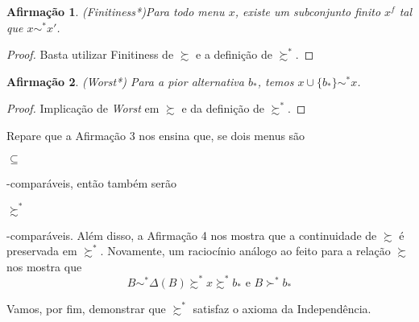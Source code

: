 \documentclass[11pt, a4paper]{article}
\theoremstyle{nonumberplain}
\newtheorem{proof}{Dem.}
\theoremstyle{plain}
\newtheorem{claim}{Afirmação}
\theoremstyle{plain}
\begin{document}
\begin{claim}(Finitiness*)Para todo menu $x$, existe um subconjunto finito $x^f$ tal que $x\sim^* x'$.\end{claim}
\begin{proof}
Basta utilizar Finitiness de $\succsim$ e a definição de $\succsim^*$. 
\end{proof}

\begin{claim} (Worst*) Para a pior alternativa $b_*$, temos $x\cup\{b_*\}\sim^* x$.\end{claim}
\begin{proof}
Implicação de \textit{Worst} em $\succsim$ e da definição de $\succsim^*$. 
\end{proof}



Repare que a Afirmação 3 nos ensina que, se dois menus são \begin{small}$\subseteq$\end{small}-comparáveis, então também serão \begin{small}$\succsim^*$\end{small}-comparáveis. Além disso, a Afirmação 4 nos mostra que a continuidade de $\succsim$ é preservada em $\succsim^*$. Novamente, um raciocínio análogo ao feito para a relação $\succsim$ nos mostra que $$B\sim^*\Delta(B)\succsim^* x\succsim^* b_* \text{ e } B\succ^* b_*$$

Vamos, por fim, demonstrar que $\succsim^*$ satisfaz o axioma da Independência. 
\end{document}
